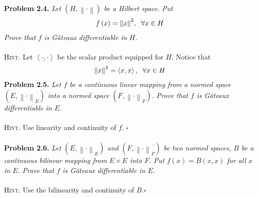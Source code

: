 \documentclass[a4paper]{article}
\numberwithin{equation}{section}
\begin{document}
\textbf{Problem 2.4.} \textit{Let $\left( {H,\left\|  \cdot  \right\|} \right)$ be a Hilbert space. Put}
\begin{align}
f\left( x \right) = {\left\| x \right\|^2},\hspace{0.2cm}\forall x \in H
\end{align}
\textit{Prove that $f$ is G\^{a}teaux differentiable in $H$.}\\
\\
\textsc{Hint.} Let $\left\langle { \cdot , \cdot } \right\rangle $ be the scalar product equipped for $H$. Notice that 
\begin{align}
{\left\| x \right\|^2} = \left\langle {x,x} \right\rangle ,\hspace{0.2cm}\forall x \in H
\end{align}
\textbf{Problem 2.5.} \textit{Let $f$ be a continuous linear mapping from a normed space $\left( {E,{{\left\|  \cdot  \right\|}_E}} \right)$ into a normed space $\left( {F,{{\left\|  \cdot  \right\|}_F}} \right)$. Prove that $f$ is G\^{a}teaux differentiable in $E$.}\\
\\
\textsc{Hint.} Use linearity and continuity of $f$. \hfill $\square$\\
\\
\textbf{Problem 2.6.} \textit{Let $\left( {E,{{\left\|  \cdot  \right\|}_E}} \right)$ and $\left( {F,{{\left\|  \cdot  \right\|}_F}} \right)$ be two normed spaces, $B$ be a continuous bilinear mapping from $E\times E$ into $F$. Put $f\left(x\right)=B\left(x,x\right)$ for all $x$ in $E$. Prove that $f$ is G\^{a}teaux differentiable in $E$.}\\
\\
\textsc{Hint.} Use the bilinearity and continuity of $B$.\hfill $\square$\\
\end{document}
